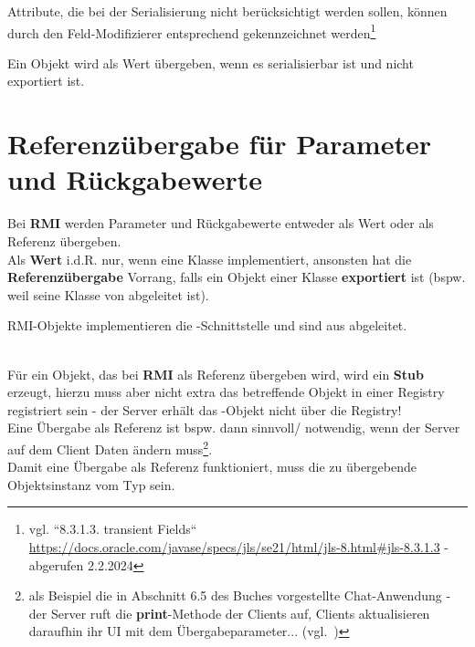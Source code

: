 \noindent
Attribute, die bei der Serialisierung nicht berücksichtigt werden sollen, können durch den Feld-Modifizierer  entsprechend gekennzeichnet werden\footnote{
vgl. ``8.3.1.3. transient Fields`` \url{https://docs.oracle.com/javase/specs/jls/se21/html/jls-8.html#jls-8.3.1.3} - abgerufen 2.2.2024
}


\begin{tcolorbox}
    Ein Objekt wird als Wert übergeben, wenn es serialisierbar ist und nicht exportiert ist.
\end{tcolorbox}


\section{Referenzübergabe für Parameter und Rückgabewerte}

Bei \textbf{RMI} werden Parameter und Rückgabewerte entweder als Wert oder als Referenz übergeben.\\

\noindent
Als \textbf{Wert} i.d.R. nur, wenn eine Klasse  implementiert, ansonsten hat die \textbf{Referenzübergabe} Vorrang, falls ein Objekt einer Klasse \textbf{exportiert} ist (bspw. weil seine Klasse von  abgeleitet ist).\\



\begin{tcolorbox}
    RMI-Objekte implementieren die -Schnittstelle und sind aus  abgeleitet.
\end{tcolorbox}\\

\noindent
Für ein Objekt, das bei \textbf{RMI} als Referenz übergeben wird, wird ein \textbf{Stub} erzeugt, hierzu muss aber nicht extra das betreffende Objekt in einer Registry registriert sein - der Server erhält das -Objekt nicht über die Registry!\\

\noindent
Eine Übergabe als Referenz ist bspw. dann sinnvoll/ notwendig, wenn der Server auf dem Client Daten ändern muss\footnote{als Beispiel die in Abschnitt 6.5 des Buches vorgestellte Chat-Anwendung - der Server ruft die \textbf{print}-Methode der Clients auf, Clients aktualisieren daraufhin ihr UI mit dem Übergabeparameter... (vgl.~\cite[Listing 6.22, Listing 6.24]{Oec22})}.\\

\noindent
Damit eine Übergabe als Referenz funktioniert, muss die zu übergebende Objektsinstanz vom Typ sein.\\

